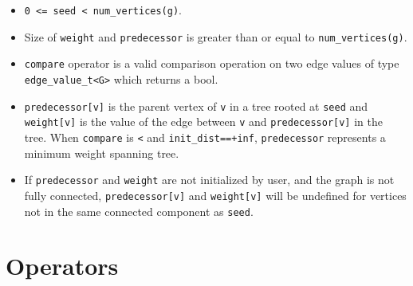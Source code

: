 {\small
      
}
\begin{itemdescr}
\end{itemdescr}

\begin{itemdescr}
      \pnum\preconditions
            \begin{itemize}
                  \item
                        \lstinline{0 <= seed < num_vertices(g)}.
                  \item
                        Size of \lstinline{weight} and \lstinline{predecessor} is greater than or equal to \lstinline{num_vertices(g)}.
                  \item
                        \lstinline{compare} operator is a valid comparison operation on two edge values of type \lstinline{edge_value_t<G>} which returns a bool.
            \end{itemize}
      \pnum\effects
            \begin{itemize}
                  \item
                        \lstinline{predecessor[v]} is the parent vertex of \lstinline{v} in a tree rooted at \lstinline{seed} and \lstinline{weight[v]} is the value of the edge between \lstinline{v} and \lstinline{predecessor[v]} in the tree. When \lstinline{compare} is \lstinline{<} and \lstinline{init_dist==+inf}, \lstinline{predecessor} represents a minimum weight spanning tree.
                  \item
                        If \lstinline{predecessor} and \lstinline{weight} are not initialized by user, and the graph is not fully connected, \lstinline{predecessor[v]} and \lstinline{weight[v]} will be undefined for vertices not in the same connected component as \lstinline{seed}.
            \end{itemize}
\end{itemdescr}

\section{Operators}

